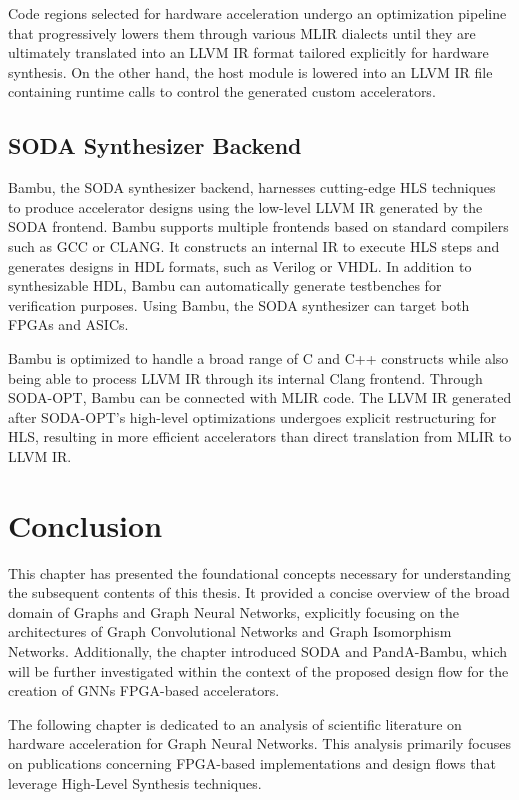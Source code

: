  Code regions selected for hardware acceleration undergo an optimization pipeline that progressively lowers them through various MLIR dialects until they are ultimately translated into an LLVM IR format tailored explicitly for hardware synthesis.
On the other hand, the host module is lowered into an LLVM IR file containing runtime calls to control the generated custom accelerators.

\subsection{SODA Synthesizer Backend}
\label{subsec:soda_backend}%

Bambu, the SODA synthesizer backend, harnesses cutting-edge HLS techniques to produce accelerator designs using the low-level LLVM IR generated by the SODA frontend.
Bambu supports multiple frontends based on standard compilers such as GCC or CLANG.
It constructs an internal IR to execute HLS steps and generates designs in HDL formats, such as Verilog or VHDL.
In addition to synthesizable HDL, Bambu can automatically generate testbenches for verification purposes.
Using Bambu, the SODA synthesizer can target both FPGAs and ASICs.

Bambu is optimized to handle a broad range of C and C++ constructs while also being able to process LLVM IR through its internal Clang frontend.
Through SODA-OPT, Bambu can be connected with MLIR code.
The LLVM IR generated after SODA-OPT's high-level optimizations undergoes explicit restructuring for HLS, resulting in more efficient accelerators than direct translation from MLIR to LLVM IR.

\section{Conclusion}
\label{sec:background_conclusion}%
This chapter has presented the foundational concepts necessary for understanding the subsequent contents of this thesis.
It provided a concise overview of the broad domain of Graphs and Graph Neural Networks, explicitly focusing on the architectures of Graph Convolutional Networks and Graph Isomorphism Networks.
Additionally, the chapter introduced SODA and PandA-Bambu, which will be further investigated within the context of the proposed design flow for the creation of GNNs FPGA-based accelerators.

The following chapter is dedicated to an analysis of scientific literature on hardware acceleration for Graph Neural Networks.
This analysis primarily focuses on publications concerning FPGA-based implementations and design flows that leverage High-Level Synthesis techniques.
